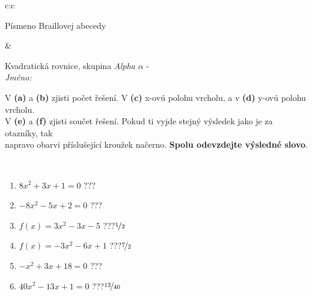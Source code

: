 \documentclass[10pt]{report}
\begin{document}
\begin{tabular}{c:c}
\begin{minipage}[c][104.5mm][t]{0.5\linewidth}
\begin{center}
\begin{minipage}{0.20\linewidth}
\begin{center}
{\small Písmeno Braillovej abecedy}
\end{center}
\end{minipage}
\end{center}
\end{minipage}
&
\begin{minipage}[c][104.5mm][t]{0.5\linewidth}
\begin{center}
\vspace{7mm}
{\huge Kvadratická rovnice, skupina \textit{Alpha $\alpha$} -}\\[5mm]
\textit{Jméno:}\phantom{xxxxxxxxxxxxxxxxxxxxxxxxxxxxxxxxxxxxxxxxxxxxxxxxxxxxxxxxxxxxxxxxx}\\[5mm]
\begin{minipage}{0.95\linewidth}
\begin{center}
V \textbf{(a)} a \textbf{(b)} zjisti počet řešení. V \textbf{(c)} x-ovú polohu vrcholu, a v \textbf{(d)} y-ovú polohu vrcholu.\\V \textbf{(e)} a \textbf{(f)} zjisti součet řešení. Pokud ti vyjde stejný výsledek jako je za otazníky, tak\\napravo obarvi příslušející kroužek načerno. \textbf{Spolu odevzdejte výsledné slovo}.
\end{center}
\end{minipage}
\\[1mm]
\begin{minipage}{0.79\linewidth}
\begin{center}
\begin{varwidth}{\linewidth}
\begin{enumerate}
\Large
\item $8x^2+3x+1=0$\quad \dotfill\; ???\;\dotfill {}
\item $-8x^2-5x+2=0$\quad \dotfill\; ???\;\dotfill {}
\item $f(x)=3x^2-3x-5$\quad \dotfill\; ???\;\dotfill \quad $\nicefrac{1}{2}$
\item $f(x)=-3x^2-6x+1$\quad \dotfill\; ???\;\dotfill \quad $\nicefrac{7}{2}$
\item $-x^2+3x+18=0$\quad \dotfill\; ???\;\dotfill {}
\item $40x^2-13x+1=0$\quad \dotfill\; ???\;\dotfill \quad $\nicefrac{13}{40}$
\end{enumerate}
\end{varwidth}
\end{center}
\end{minipage}
\begin{minipage}{0.20\linewidth}

\end{minipage}
\end{center}
\end{minipage}
\end{tabular}
\end{document}
